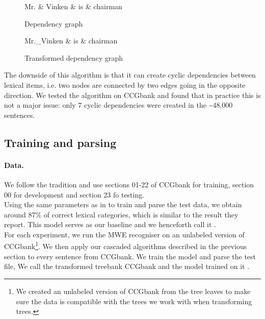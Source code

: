 \documentclass[output=paper]{LSP/langsci}
\begin{document}
    \begin{multicols}{2}
        \begin{figure}[H]
            \begin{dependency}
                \begin{deptext}[column sep=1em]
                    Mr. \& Vinken \& is \& chairman \\
                \end{deptext}
            \end{dependency}
            \caption{Dependency graph\label{dep4}}
        \end{figure}
        \columnbreak
        \begin{figure}[H]
            \begin{dependency}
                \begin{deptext}[column sep=1em]
                    Mr.\_Vinken \& is \& chairman \\
                \end{deptext}
            \end{dependency}
            \caption{Transformed dependency graph\label{dep3}}
        \end{figure}
    \end{multicols}

    \indent The downside of this algorithm is that it can create cyclic dependencies between lexical items, i.e. two nodes are connected by two edges going in the opposite direction. We tested the algorithm on CCGbank and found that in practice this is not a major issue: only 7 cyclic dependencies were created in the \textasciitilde 48,000 sentences.

    \subsection{Training and parsing}
    \label{trainparse}
    \paragraph*{Data.}
    \indent We follow the tradition and use sections 01-22 of CCGbank for training, section 00 for development and section 23 fo testing.\\
    \indent Using the same parameters as in \citet{deoskar} to train and parse the test data, we obtain around 87\% of correct lexical categories, which is similar to the result they report. This model serves as our baseline and we henceforth call it \modelA.\\
    \indent For each experiment, we run the MWE recogniser on an unlabeled version of CCGbank\footnote{We created an unlabeled version of CCGbank from the tree leaves to make sure the data is compatible with the trees we work with when transforming trees.}. We then apply our cascaded algorithms described in the previous section to every sentence from CCGbank. We train the model and parse the test file, We call the transformed treebank CCGbank and the model trained on it \modelB.
\end{document}
